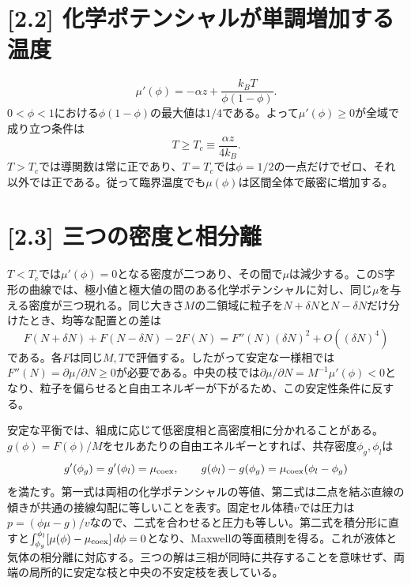 \documentclass[11pt,a4paper]{article}
\begin{document}
\section*{[2.2] 化学ポテンシャルが単調増加する温度}
\begin{equation}
 \mu'(\phi)=-\alpha z+\frac{k_BT}{\phi(1-\phi)}.
\end{equation}
$0<\phi<1$における$\phi(1-\phi)$の最大値は$1/4$である。よって$\mu'(\phi)\ge0$が全域で成り立つ条件は
\begin{equation}
 \boxed{T\ge T_c\equiv\frac{\alpha z}{4k_B}}.
\end{equation}
$T>T_c$では導関数は常に正であり、$T=T_c$では$\phi=1/2$の一点だけでゼロ、それ以外では正である。従って臨界温度でも$\mu(\phi)$は区間全体で厳密に増加する。

\section*{[2.3] 三つの密度と相分離}
$T<T_c$では$\mu'(\phi)=0$となる密度が二つあり、その間で$\mu$は減少する。このS字形の曲線では、極小値と極大値の間のある化学ポテンシャルに対し、同じ$\mu$を与える密度が三つ現れる。同じ大きさ$M$の二領域に粒子を$N+\delta N$と$N-\delta N$だけ分けたとき、均等な配置との差は
\begin{equation}
 F(N+\delta N)+F(N-\delta N)-2F(N)
 =F''(N)(\delta N)^2+O((\delta N)^4)
\end{equation}
である。各$F$は同じ$M,T$で評価する。したがって安定な一様相では$F''(N)=\partial\mu/\partial N\ge0$が必要である。中央の枝では$\partial\mu/\partial N=M^{-1}\mu'(\phi)<0$となり、粒子を偏らせると自由エネルギーが下がるため、この安定性条件に反する。

安定な平衡では、組成に応じて低密度相と高密度相に分かれることがある。$g(\phi)=F(\phi)/M$をセルあたりの自由エネルギーとすれば、共存密度$\phi_g,\phi_l$は
\begin{equation}
 g'(\phi_g)=g'(\phi_l)=\mu_{\rm coex},\qquad
 g(\phi_l)-g(\phi_g)=\mu_{\rm coex}(\phi_l-\phi_g)
\end{equation}
を満たす。第一式は両相の化学ポテンシャルの等値、第二式は二点を結ぶ直線の傾きが共通の接線勾配に等しいことを表す。固定セル体積$v$では圧力は$p=(\phi\mu-g)/v$なので、二式を合わせると圧力も等しい。第二式を積分形に直すと$\int_{\phi_g}^{\phi_l}[\mu(\phi)-\mu_{\rm coex}]\,d\phi=0$となり、Maxwellの等面積則を得る。これが液体と気体の相分離に対応する。三つの解は三相が同時に共存することを意味せず、両端の局所的に安定な枝と中央の不安定枝を表している。
\end{document}
